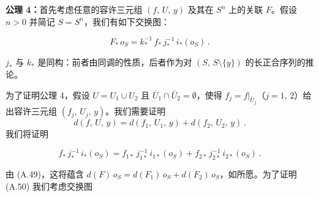 \textbf{公理 4：}首先考虑任意的容许三元组 $(f,\,U,\,y)$ 及其在 $S^n$ 上的关联\trMapping{} $F$。假设 $n>0$ 并简记 $S=S^n$，我们有如下交换图：

\noindent\begin{minipage}{\linewidth}
\centering
{}
\par
\end{minipage}

\begin{equation}\label{eq:a49-homological-degree}
F_*\,o_S=k_*^{-1}\,f_*\,j_*^{-1}\,i_*(o_S)\,.
\end{equation}

$j_*$ 与 $k_*$ 是同构：前者由同调的\trExcision{}性质，后者作为对 $(S,\,S\setminus\{y\})$ 的长正合序列的推论。

为了证明公理 4，假设 $U=U_1\cup U_2$ 且 $\bar{U}_1\cap\bar{U}_2=\emptyset$，使得 $f_j=f|_{\bar{U}_j}$（$j=1,\,2$）给出容许三元组 $(f_j,\,U_j,\,y)$。我们需要证明
\[d(f,\,U,\,y)=d(f_1,\,U_1,\,y)+d(f_2,\,U_2,\,y)\,.\]
我们将证明

\begin{equation}\label{eq:a50-additivity-decomposition}
f_*\,j_*^{-1}\,i_*(o_S)=f_{1*}\,j_{1*}^{-1}\,i_{1*}(o_S)+f_{2*}\,j_{2*}^{-1}\,i_{2*}(o_S)\,.
\end{equation}

由 (A.49)，这将蕴含 $d(F)\,o_S=d(F_1)\,o_S+d(F_2)\,o_S$，如所愿。为了证明 (A.50) 我们考虑交换图

